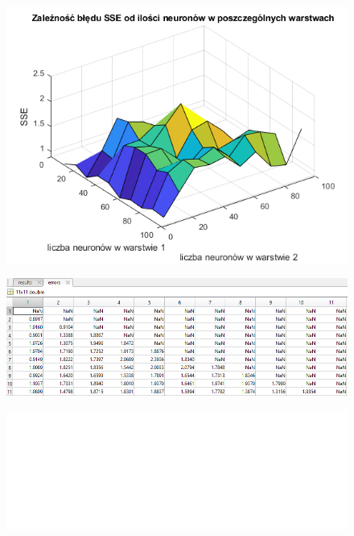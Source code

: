 \documentclass[a4paper, 12pt]{report}
\begin{document}
\begin{figure}[hbt!]
\includegraphics[width=14cm]{lr2 sse}
\centering
\end{figure}

\begin{figure}[hbt!]
\includegraphics[width=14cm]{lr2 sse dane}
\centering
\end{figure}

\begin{figure}[hbt!]
\includegraphics[width=22cm]{puste}
\centering
\end{figure}
  

\newpage
\end{document}
